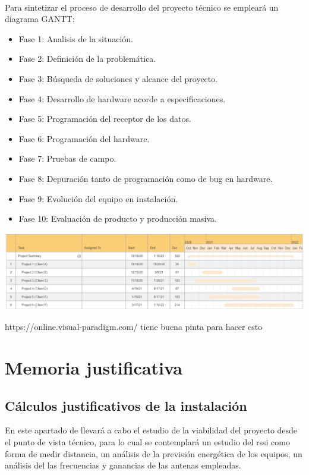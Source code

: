 \documentclass[a4paper ,12pt, onecolumn]{article}
\begin{document}
        \paragraph{}
        Para sintetizar el proceso de desarrollo del proyecto técnico se empleará un diagrama GANTT: 
        \begin{itemize}
            \item Fase 1: Analisis de la situación.
            \item Fase 2: Definición de la problemática.
            \item Fase 3: Búsqueda de soluciones y alcance del proyecto.
            \item Fase 4: Desarrollo de hardware acorde a especificaciones.
            \item Fase 5: Programación del receptor de los datos.
            \item Fase 6: Programación del hardware.
            \item Fase 7: Pruebas de campo.
            \item Fase 8: Depuración tanto de programación como de bug en hardware.
            \item Fase 9: Evolución del equipo en instalación.
            \item Fase 10: Evaluación de producto y producción masiva.
        \end{itemize}
        \begin{center}
            \includegraphics[scale=0.35]{gantt.PNG}
        \end{center}
        https://online.visual-paradigm.com/ tiene buena pinta para hacer esto
        
\section{Memoria justificativa}
    \subsection{Cálculos justificativos de la instalación}
        En este apartado de llevará a cabo el estudio de la viabilidad del proyecto desde el punto de vista
        técnico, para lo cual se contemplará un estudio del rssi como forma de medir distancia, un análisis 
        de la previsión energética de los equipos, un análisis del las frecuencias y ganancias de las antenas 
        empleadas.
\end{document}
